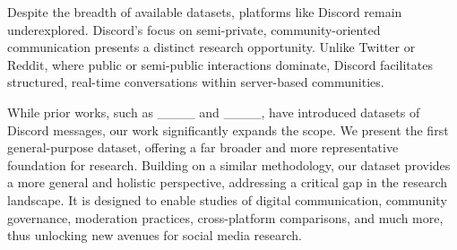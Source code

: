 Despite the breadth of available datasets, platforms like Discord remain underexplored. Discord’s focus on semi-private, community-oriented communication presents a distinct research opportunity. Unlike Twitter or Reddit, where public or semi-public interactions dominate, Discord facilitates structured, real-time conversations within server-based communities.

While prior works, such as ____ and ____, have introduced datasets of Discord messages, our work significantly expands the scope. We present the first general-purpose dataset, offering a far broader and more representative foundation for research. Building on a similar methodology, our dataset provides a more general and holistic perspective, addressing a critical gap in the research landscape. It is designed to enable studies of digital communication, community governance, moderation practices, cross-platform comparisons, and much more, thus unlocking new avenues for social media research.






